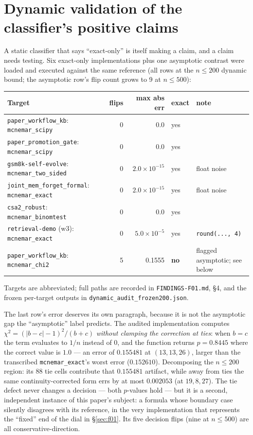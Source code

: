 \documentclass[10pt]{article}
\newcommand{\code}[1]{\texttt{#1}}
\begin{document}
\section{Dynamic validation of the classifier's positive claims}\label{sec:dynamic}

A static classifier that says ``exact-only'' is itself making a claim, and a
claim needs testing. Six exact-only implementations plus one asymptotic contrast were loaded and
executed against the same reference (all rows at the $n\le200$ dynamic bound; the
asymptotic row's flip count grows to 9 at $n\le500$):

\begin{center}
\small
\begin{tabular}{lrrlp{4.0cm}}
\toprule
Target & flips & max abs err & exact & note \\
\midrule
\code{paper\_workflow\_kb}: \code{mcnemar\_scipy} & 0 & 0.0 & yes & \\
\code{paper\_promotion\_gate}: \code{mcnemar\_scipy} & 0 & 0.0 & yes & \\
\code{gsm8k-self-evolve}: \code{mcnemar\_two\_sided} & 0 & $2.0{\times}10^{-15}$ & yes & float noise \\
\code{joint\_mem\_forget\_formal}: \code{mcnemar\_exact} & 0 & $2.0{\times}10^{-15}$ & yes & float noise \\
\code{csa2\_robust}: \code{mcnemar\_binomtest} & 0 & 0.0 & yes & \\
\code{retrieval-demo} (w3): \code{mcnemar\_exact} & 0 & $5.0{\times}10^{-5}$ & yes & \code{round(..., 4)} \\
\midrule
\code{paper\_workflow\_kb}: \code{mcnemar\_chi2} & 5 & 0.1555 & \textbf{no} & flagged asymptotic; see below \\
\bottomrule
\end{tabular}

\vspace{2pt}
{\footnotesize Targets are abbreviated; full paths are recorded in
\code{FINDINGS-F01.md}, \S4, and the frozen per-target outputs in
\code{dynamic\_audit\_frozen200.json}.}
\end{center}

The last row's error deserves its own paragraph, because it is not the
asymptotic gap the ``asymptotic'' label predicts. The audited implementation
computes $\chi^2 = (|b-c|-1)^2/(b+c)$ \emph{without clamping the correction
at ties}: when $b = c$ the term evaluates to $1/n$ instead of $0$, and the
function returns $p = 0.8445$ where the correct value is $1.0$ --- an error
of $0.155481$ at $(13,13,26)$, larger than the transcribed
\code{mcnemar\_exact}'s worst error ($0.152610$). Decomposing the $n\le200$
region: its 88 tie cells contribute that $0.155481$ artifact, while away
from ties the same continuity-corrected form errs by at most $0.002053$ (at
$19,8,27$). The tie defect never changes a decision --- both $p$-values
hold --- but it is a second, independent instance of this paper's subject: a
formula whose boundary case silently disagrees with its reference, in the
very implementation that represents the ``fixed'' end of the dial in
\S\ref{sec:f01}. Its five decision flips (nine at $n\le500$) are all
conservative-direction.
\end{document}
